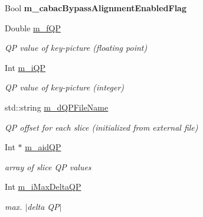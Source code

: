 \begin{DoxyCompactItemize}
Bool {\bfseries m\+\_\+cabac\+Bypass\+Alignment\+Enabled\+Flag}
\item 
\mbox{\label{class_t_app_enc_cfg_a8b82bfe34ba37dc890d344ce158ef214}} 
Double \hyperlink{class_t_app_enc_cfg_a8b82bfe34ba37dc890d344ce158ef214}{m\+\_\+f\+QP}
\begin{DoxyCompactList}\small\item\em QP value of key-\/picture (floating point) \end{DoxyCompactList}\item 
\mbox{\label{class_t_app_enc_cfg_a6ee8734faf8374082dabbedf0031cf71}} 
Int \hyperlink{class_t_app_enc_cfg_a6ee8734faf8374082dabbedf0031cf71}{m\+\_\+i\+QP}
\begin{DoxyCompactList}\small\item\em QP value of key-\/picture (integer) \end{DoxyCompactList}\item 
\mbox{\label{class_t_app_enc_cfg_a7f7e48023012fabd44aed72cbadee2e9}} 
std\+::string \hyperlink{class_t_app_enc_cfg_a7f7e48023012fabd44aed72cbadee2e9}{m\+\_\+d\+Q\+P\+File\+Name}
\begin{DoxyCompactList}\small\item\em QP offset for each slice (initialized from external file) \end{DoxyCompactList}\item 
\mbox{\label{class_t_app_enc_cfg_aad56a3c3ad2aec168c18eaf0cfabc551}} 
Int $\ast$ \hyperlink{class_t_app_enc_cfg_aad56a3c3ad2aec168c18eaf0cfabc551}{m\+\_\+aid\+QP}
\begin{DoxyCompactList}\small\item\em array of slice QP values \end{DoxyCompactList}\item 
\mbox{\label{class_t_app_enc_cfg_a4f53790ec8d9a05c7b04ce02ec6e9ad5}} 
Int \hyperlink{class_t_app_enc_cfg_a4f53790ec8d9a05c7b04ce02ec6e9ad5}{m\+\_\+i\+Max\+Delta\+QP}
\begin{DoxyCompactList}\small\item\em max. $\vert$delta Q\+P$\vert$ \end{DoxyCompactList}\item 
\mbox{\label{class_t_app_enc_cfg_abef6196c36ebef24f6423ecead9f2fda}} 

\end{DoxyCompactItemize}
